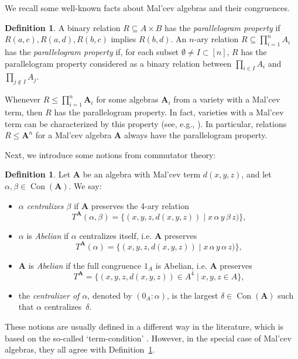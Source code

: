\documentclass[12pt]{amsart}
\theoremstyle{definition}
\theoremstyle{definition}
\newtheorem{definition}[theorem]{Definition}
\newcommand{\alg}[1]{\mathbf{#1}}
\newcommand{\algA}{\alg{A}}
\DeclareMathOperator{\Con}{Con}
\begin{document}
We recall some well-known facts about Mal'cev algebras and their congruences.

\begin{definition}A binary relation $R \subseteq A \times B$ has the \emph{parallelogram property} if $R(a,c),R(a,d),R(b,c)$ implies $R(b,d)$. An $n$-ary relation $R \subseteq \prod_{i=1}^n A_i$ has the \emph{parallelogram property} if, for each subset $\emptyset \neq I \subset [n]$, $R$ has the parallelogram property considered as a binary relation between $\prod_{i \in I}A_i$ and $ \prod_{j \notin I}A_j$.
\end{definition}

Whenever $R \leq \prod_{i=1}^n \alg{A}_i$ for some algebras $\alg{A}_i$ from a variety with a Mal'cev term, then $R$ has the parallelogram property. In fact, varieties with a Mal'cev term can be characterized by this property (see, e.g., \cite[Theorem 3.7.]{KS-parallelogramterms}). In particular, relations $R \leq \alg{A}^n$ for a Mal'cev algebra $\alg{A}$ always have the parallelogram property.

Next, we introduce some notions from commutator theory:

\begin{definition} \label{def:centralize}
Let $\algA$ be an algebra with Mal'cev term $d(x,y,z)$, and let $\alpha, \beta \in \Con(\algA)$. We say:
\begin{itemize}
\item \emph{$\alpha$ centralizes $\beta$} if $\algA$ preserves the 4-ary relation
$$T^\algA(\alpha,\beta) = \{(x,y,z,d(x,y,z)) \mid x \, \alpha \, y \, \beta \, z)\},$$
\item $\alpha$ is \emph{Abelian} if $\alpha$ centralizes itself, i.e. $\algA$ preserves
$$T^\algA(\alpha) = \{(x,y,z,d(x,y,z)) \mid x \, \alpha \, y \, \alpha \, z)\},$$
\item $\algA$ is \emph{Abelian} if the full congruence $1_A$ is Abelian, i.e. $\algA$ preserves
$$T^\algA = \{(x,y,z,d(x,y,z)) \in A^4 \mid x,y,z \in A\},$$
\item the \emph{centralizer of $\alpha$}, denoted by $(0_A:\alpha)$, is the largest $\delta \in \Con(\algA)$ such that $\alpha$ centralizes~$\delta$. 
\end{itemize}
\end{definition}
These notions are usually defined in a different way in the literature, which is based on the so-called `term-condition' \cite[Chapter 4]{FreeseMcKenzie}. However, in the special case of Mal'cev algebras, they all agree with Definition~\ref{def:centralize}.
\end{document}
